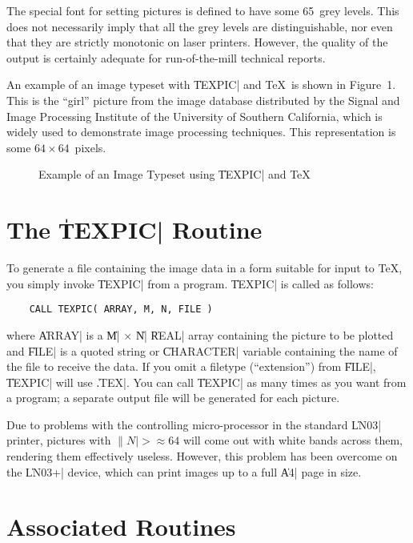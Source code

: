 The special font for setting pictures is
defined to have some 65~grey levels. This does not necessarily imply that all
the grey levels are distinguishable, nor even that they are strictly monotonic
on laser printers. However, the quality of the output is certainly adequate for
run-of-the-mill technical reports. 

An example of an image typeset with \|TEXPIC| and \TeX\ is shown in
Figure~1. This is the ``girl'' picture from the image database
distributed by the Signal and Image Processing Institute of the University of
Southern California, which is widely used to demonstrate image processing
techniques. This representation is some $64 \times 64$~pixels. 

\begin{figure}
   \centering
   \fbox{\relax}
   \caption{Example of an Image Typeset using \|TEXPIC| and \TeX}
\end{figure}

\section{The \|TEXPIC| Routine}

To generate a file containing the image data in a form suitable for input to
\TeX, you simply invoke \|TEXPIC| from a program. \|TEXPIC| is called as
follows:

\begin{verbatim}
    CALL TEXPIC( ARRAY, M, N, FILE )
\end{verbatim}

\noindent where \|ARRAY| is a \|M| $\times$ \|N| \|REAL| array containing the
picture to be plotted and \|FILE| is a quoted string or \|CHARACTER| variable
containing the name of the file to receive the data. If you omit a filetype
(``extension'') from \|FILE|, \|TEXPIC| will use \|.TEX|. You can call
\|TEXPIC| as many times as you want from a program; a separate output file will
be generated for each picture.

Due to problems with the controlling micro-processor in the standard \|LN03|
printer, pictures with $\|N| > \approx 64$ will come out with white bands
across them, rendering them effectively useless. However, this problem has been
overcome on the \|LN03+| device, which can print images up to a full \|A4|
page in size. 


\section{Associated Routines}

